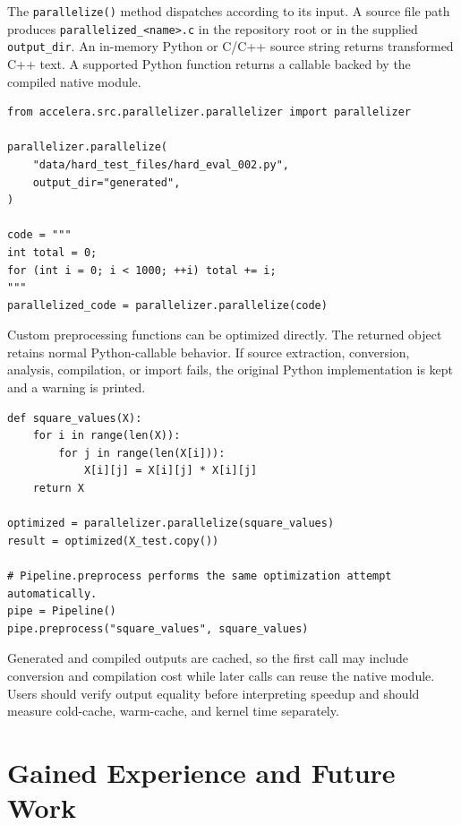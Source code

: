 \documentclass[12pt,a4paper,oneside]{report}
\renewcommand{\lstlistingname}{Algorithm}
\begin{document}
The \texttt{parallelize()} method dispatches according to its input. A source
file path produces \texttt{parallelized\_<name>.c} in the repository root or in
the supplied \texttt{output\_dir}. An in-memory Python or C/C++ source string
returns transformed C++ text. A supported Python function returns a callable
backed by the compiled native module.

\begin{lstlisting}[style=paperpython,basicstyle=\ttfamily\small,caption={Parallelizing files and source strings},label={lst:user-source-parallelizer}]
from accelera.src.parallelizer.parallelizer import parallelizer

parallelizer.parallelize(
    "data/hard_test_files/hard_eval_002.py",
    output_dir="generated",
)

code = """
int total = 0;
for (int i = 0; i < 1000; ++i) total += i;
"""
parallelized_code = parallelizer.parallelize(code)
\end{lstlisting}

Custom preprocessing functions can be optimized directly. The returned object
retains normal Python-callable behavior. If source extraction, conversion,
analysis, compilation, or import fails, the original Python implementation is
kept and a warning is printed.

\newpage
\begin{lstlisting}[style=paperpython,basicstyle=\ttfamily\small,caption={Optimizing a Python function and using automatic integration},label={lst:user-function-parallelizer}]
def square_values(X):
    for i in range(len(X)):
        for j in range(len(X[i])):
            X[i][j] = X[i][j] * X[i][j]
    return X

optimized = parallelizer.parallelize(square_values)
result = optimized(X_test.copy())

# Pipeline.preprocess performs the same optimization attempt automatically.
pipe = Pipeline()
pipe.preprocess("square_values", square_values)
\end{lstlisting}

Generated and compiled outputs are cached, so the first call may include
conversion and compilation cost while later calls can reuse the native module.
Users should verify output equality before interpreting speedup and should
measure cold-cache, warm-cache, and kernel time separately.
\renewcommand{\lstlistingname}{Algorithm}

\chapter{Gained Experience and Future Work}
\label{chap:experience-future-work}
\end{document}
